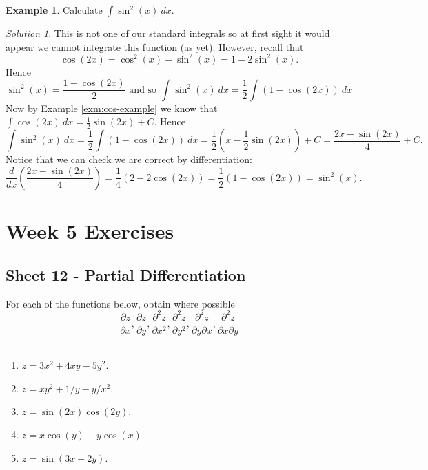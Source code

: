 \documentclass[
  11pt,
  oneside]{book}
\providecommand{\tightlist}{%
  \setlength{\itemsep}{0pt}\setlength{\parskip}{0pt}}
\newcommand{\slide}{}
\theoremstyle{definition}
\theoremstyle{definition}
\newtheorem{example}{Example}[chapter]
\theoremstyle{definition}
\theoremstyle{definition}
\theoremstyle{remark}
\newtheorem*{solution}{Solution}
\begin{document}
\slide

\begin{example}
Calculate \(\displaystyle\int\sin^2(x)\ dx\).
\end{example}

\begin{solution}
This is not one of our standard integrals so at first sight it would appear we cannot integrate this function (as yet). However, recall that
\[
\cos(2x) = \cos^2(x)-\sin^2(x) = 1-2\sin^2(x).
\]
Hence
\[
\sin^2(x) = \frac{1-\cos(2x)}{2}\text{ and so }\int\sin^2(x)\ dx = \frac12\int(1-\cos(2x))\ dx
\]
Now by Example \ref{exm:cos-example} we know that \(\displaystyle\int\cos(2x)\ dx = \frac12\sin(2x)+C\).
Hence
\[
\int\sin^2(x)\ dx = \frac12\int(1-\cos(2x))\ dx = \frac12\left(x-\frac12\sin(2x)\right)+C = \frac{2x-\sin(2x)}{4}+C.
\]
Notice that we can check we are correct by differentiation:
\[
\frac{d}{dx}\left(\frac{2x-\sin(2x)}{4}\right)=\frac14\left(2-2\cos(2x)\right)=\frac12\left(1-\cos(2x)\right)=\sin^2(x).
\]
\end{solution}

\chapter*{Week 5 Exercises}\label{week-5-exercises}

\section{Sheet 12 - Partial Differentiation}\label{sheet-12---partial-differentiation}

For each of the functions below, obtain where possible
\[
\frac{\partial z}{\partial x}, \frac{\partial z}{\partial y}, \frac{\partial^2 z}{\partial x^2}, \frac{\partial^2 z}{\partial y^2}, \frac{\partial^2 z}{\partial y\partial x}, \frac{\partial^2 z}{\partial x\partial y}
\]
~

\begin{enumerate}
\def\labelenumi{\arabic{enumi}.}
\tightlist
\item
  \(z=3x^2+4xy-5y^2\).
\item
  \(z=xy^2+1/y-y/x^2\).
\item
  \(z=\sin(2x)\cos(2y)\).
\item
  \(z=x\cos(y)-y\cos(x)\).
\item
  \(z=\sin(3x+2y)\).
\end{enumerate}

~
\end{document}
